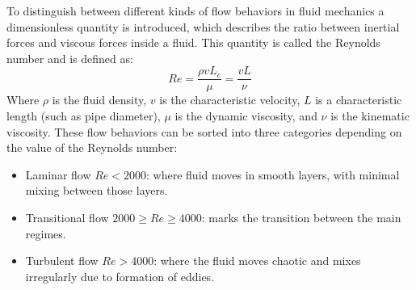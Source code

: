To distinguish between different kinds of flow behaviors in fluid mechanics a dimensionless quantity is introduced, which describes the ratio between inertial forces and viscous forces inside a fluid.
This quantity is called the Reynolds number and is defined as:
$$
	Re = \frac{\rho v L_c}{\mu} = \frac{v L}{\nu}
$$ 
Where $\rho$ is the fluid density, $v$ is the characteristic velocity, $L$ is a characteristic length (such as pipe diameter), $\mu$ is the dynamic viscosity, and $\nu$ is the kinematic viscosity.
These flow behaviors can be sorted into three categories depending on the value of the Reynolds number:
\begin{itemize}
	\item Laminar flow $Re < 2000$: where fluid moves in smooth layers, with minimal mixing between those layers.
	\item Transitional flow $2000 \ge Re \ge 4000$: marks the transition between the main regimes.
	\item Turbulent flow $Re > 4000$: where the fluid moves chaotic and mixes irregularly due to formation of eddies.
\end{itemize}
